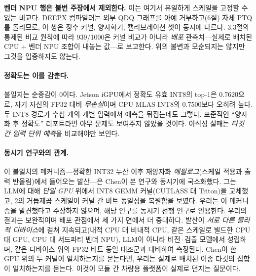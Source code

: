 \documentclass[11pt]{article}
\begin{document}
\textbf{벤더 NPU 행은 불변 주장에서 제외한다.} 이는 여기서 유일하게 스케일을 고정할 수 없는 비교다. DEEPX 컴파일러는 외부 QDQ 그래프를 아예 거부하고(6절) 자체 PTQ를 돌리므로, 이 쌍은 정수 커널, 양자화기, 캘리브레이션 셋이 동시에 다르다. 3.3절의 통제된 비교 원칙에 따라 939/1000은 커널 비교가 아니라 \emph{배포} 관측치---실제로 배치된 CPU + 벤더 NPU 조합이 내놓는 값---로 보고한다. 위의 불변과 모순되지는 않지만 그것을 입증하지도 않는다.

\paragraph{정확도는 이를 감춘다.}
불일치는 순증감이 0이다. Jetson iGPU에서 정확도 유효 INT8의 top-1은 0.7620으로, 자기 자신의 FP32 대비 \emph{무손실}이며 CPU MLAS INT8의 0.7500보다 오히려 높다. 두 INT8 경로가 수십 개의 개별 입력에서 예측을 뒤집는데도 그렇다. 표준적인 ``양자화 후 정확도'' 리포트라면 아무 문제도 보여주지 않았을 것이다. 이식성 실패는 \emph{타깃 간 입력 단위 예측}을 비교해야만 보인다.

\paragraph{동시기 연구와의 관계.}
이 불일치의 메커니즘---정확한 INT32 누산 이후 재양자화 \emph{에필로그}(스케일 적용과 출력 반올림)에서 들어오는 발산---은 Chen\citep{chen2026integeralibi, chen2026deterministic}이 본 연구와 동시기에 국소화했다. 그는 LLM에 대해 \emph{단일 GPU} 위에서 INT8 GEMM 커널(CUTLASS 대 Triton)을 교체했고, 2의 거듭제곱 스케일이 커널 간 비트 동일성을 복원함을 보였다. 우리는 이 메커니즘을 발견했다고 주장하지 않으며, 해당 연구를 동시기 선행 연구로 인용한다. 우리의 결과는 보완적이며 배포 관점에서 세 가지 면에서 더 중대하다. 발산이 \emph{서로 다른 물리적 디바이스}에 걸쳐 지속되고(내적 CPU 대 비내적 CPU, 같은 스케일로 빌드한 CPU 대 GPU, CPU 대 서드파티 벤더 NPU), LLM이 아니라 비전\,$\cdot$\,검출 모델에서 성립하며, 같은 디바이스 위의 FP32 비트 동일 대조군과 대비하여 측정된다. Chen이 한 GPU 위의 두 커널이 일치하는지를 묻는다면, 우리는 실제로 배치된 이종 타깃의 집합이 일치하는지를 묻는다. 이것이 모듈 간 차량용 플랫폼이 실제로 던지는 질문이다.
\end{document}
